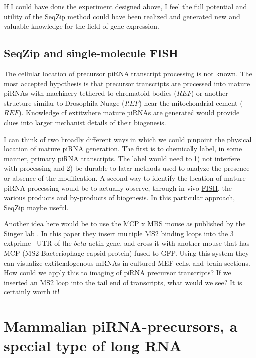     If I could have done the experiment designed above, I feel the full potential and utility of the SeqZip method could have been realized and generated new and valuable knowledge for the field of gene expression.

  \subsection{SeqZip and single-molecule FISH}
    The cellular location of precursor piRNA transcript processing is not known. The most accepted hypothesis is that precursor transcripts are processed into mature piRNAs with machinery tethered to chromatoid bodies ($REF$) or another structure similar to Drosophila Nuage ($REF$) near the mitochondrial cement ($REF$). Knowledge of   extit{where} mature piRNAs are generated would provide clues into larger mechanist details of their biogenesis. 

    I can think of two broadly different ways in which we could pinpoint the physical location of mature piRNA generation. The first is to chemically label, in some manner, primary piRNA transcripts. The label would need to 1) not interfere with processing and 2) be durable to later methods used to analyze the presence or absence of the modification. A second way to identify the location of mature piRNA processing would be to actually observe, through in vivo \hyperref[hd:abrevs]{FISH}, the various products and by-products of biogenesis. In this particular approach, SeqZip maybe useful.

    Another idea here would be to use the MCP x MBS mouse as published by the Singer lab \citep{Park2014}. In this paper they insert multiple MS2 binding loops into the 3  extprime~-UTR of the $beta$-actin gene, and cross it with another mouse that has MCP (MS2 Bacteriophage capsid protein) fused to GFP. Using this system they can visualize   extit{endogenous} mRNAs in cultured MEF cells, and brain sections. How could we apply this to imaging of piRNA precursor transcripts? If we inserted an MS2 loop into the tail end of transcripts, what would we see? It is certainly worth it!

\section{Mammalian piRNA-precursors, a special type of long RNA}

